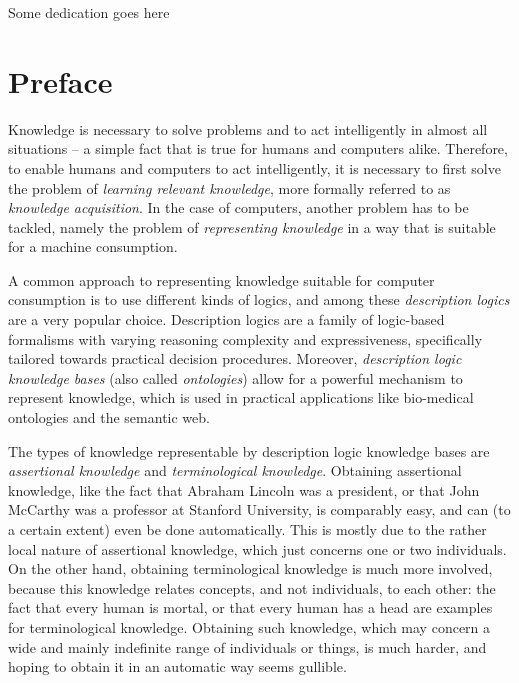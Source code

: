 \vspace*{0.38196601125\textheight}
\begin{center}
  Some dedication goes here
\end{center}

\chapter*{Preface}
\label{cha:preface}

\thispagestyle{empty}

Knowledge is necessary to solve problems and to act intelligently in almost all situations
-- a simple fact that is true for humans and computers alike.  Therefore, to enable humans
and computers to act intelligently, it is necessary to first solve the problem of
\emph{learning relevant knowledge}, more formally referred to as \emph{knowledge
  acquisition}.  In the case of computers, another problem has to be tackled, namely the
problem of \emph{representing knowledge} in a way that is suitable for a machine
consumption.

A common approach to representing knowledge suitable for computer consumption is to use
different kinds of logics, and among these \emph{description logics} are a very popular
choice.  Description logics are a family of logic-based formalisms with varying reasoning
complexity and expressiveness, specifically tailored towards practical decision
procedures.  Moreover, \emph{description logic knowledge bases} (also called
\emph{ontologies}) allow for a powerful mechanism to represent knowledge, which is used in
practical applications like bio-medical ontologies and the semantic web.

The types of knowledge representable by description logic knowledge bases are
\emph{assertional knowledge} and \emph{terminological knowledge}.  Obtaining assertional
knowledge, like the fact that Abraham Lincoln was a president, or that John McCarthy was a
professor at Stanford University, is comparably easy, and can (to a certain extent) even
be done automatically.  This is mostly due to the rather local nature of assertional
knowledge, which just concerns one or two individuals.  On the other hand, obtaining
terminological knowledge is much more involved, because this knowledge relates concepts,
and not individuals, to each other: the fact that every human is mortal, or that every
human has a head are examples for terminological knowledge.  Obtaining such knowledge,
which may concern a wide and mainly indefinite range of individuals or things, is much
harder, and hoping to obtain it in an automatic way seems gullible.

